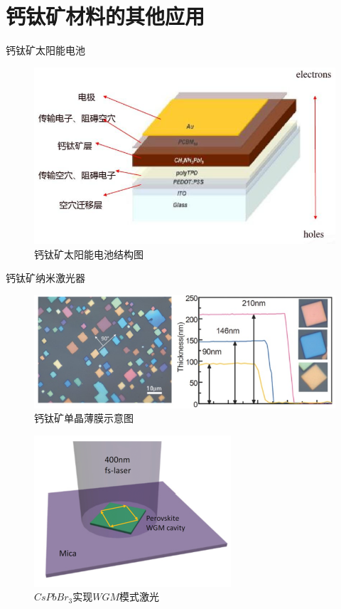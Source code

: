 \documentclass{beamer}[fontset=windows]
\begin{document}
\section{钙钛矿材料的其他应用}
\begin{frame}{钙钛矿太阳能电池}
	\begin{figure}[H]
		\centering
		\hspace{2em}\includegraphics[width=.8\linewidth]{pic/6.png}
		\caption{钙钛矿太阳能电池结构图
		}
	\end{figure}
\end{frame}
\begin{frame}{钙钛矿纳米激光器}
	\begin{figure}[H]
		\centering
		\hspace{2em}\includegraphics[width=.8\linewidth]{pic/7.png}
		\caption{钙钛矿单晶薄膜示意图\cite{zhang2016high}
		}
	\end{figure}
\end{frame}
\begin{frame}
	\begin{figure}[H]
		\centering
		\hspace{2em}\includegraphics[width=.7\linewidth]{pic/8.png}
		\caption{$CsPbBr_{3}$实现$WGM$模式激光\cite{zhang2016high}
		}
	\end{figure}
\end{frame}
\end{document}
